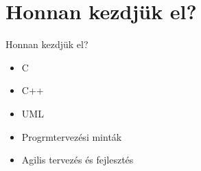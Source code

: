 \section{Honnan kezdjük el?}

\begin{frame}{Honnan kezdjük el?}
  \begin{itemize}
  \item C
  \item C++
  \item UML
  \item Progrmtervezési minták
  \item Agilis tervezés és fejlesztés
  \end{itemize}
\end{frame}
